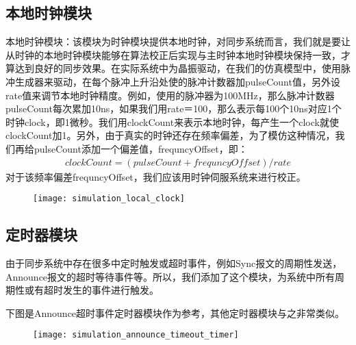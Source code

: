 \subsection{本地时钟模块}
本地时钟模块：该模块为时钟模块提供本地时钟，对同步系统而言，我们就是要让从时钟的本地时钟模块能够在算法校正后实现与主时钟本地时钟模块保持一致，才算达到良好的同步效果。在实际系统中为晶振驱动，在我们的仿真模型中，使用脉冲生成器来驱动，在每个脉冲上升沿处使的脉冲计数器加pulseCount值，另外设rate值来调节本地时钟精度。例如，使用的脉冲器为100MHz，那么脉冲计数器pulseCount每次累加10ns，如果我们用rate＝100，那么表示每100个10ns对应1个时钟clock，即1微秒。我们用clockCount来表示本地时钟，每产生一个clock就使clockCount加1。另外，由于真实的时钟还存在频率偏差，为了模仿这种情况，我们再给pulseCount添加一个偏差值，frequncyOffset，即：
\begin{align}
	clockCount = (pulseCount + frequncyOffset) / rate
\end{align}
对于该频率偏差frequncyOffset，我们应该用时钟伺服系统来进行校正。
\begin{figure}[!hbp]
  \centering
  \begin{minipage}[b]{1\textwidth}
    \captionstyle{\centering}
    \centering
    \texttt{[image: simulation\_local\_clock]}
  \end{minipage}     
\end{figure}

\subsection{定时器模块}
由于同步系统中存在很多中定时触发或超时事件，例如Sync报文的周期性发送，Announce报文的超时等待事件等。所以，我们添加了这个模块，为系统中所有周期性或有超时发生的事件进行触发。

下图是Announce超时事件定时器模块作为参考，其他定时器模块与之非常类似。
\begin{figure}[!hbp]
  \centering
  \begin{minipage}[b]{1\textwidth}
    \captionstyle{\centering}
    \centering
    \texttt{[image: simulation\_announce\_timeout\_timer]}
  \end{minipage}     
\end{figure}

